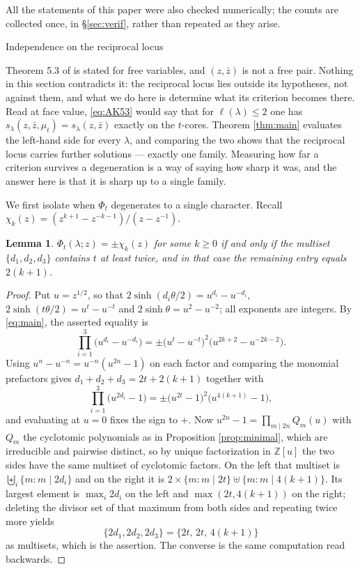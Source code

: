 \documentclass[11pt,reqno]{amsart}
\makeatletter
\renewcommand\section{\@startsection{section}{1}%
  \z@{\linespacing\@plus\linespacing}{.5\linespacing}%
  {\normalfont\large\bfseries\centering}}
\theoremstyle{plain}
\newtheorem{lemma}[theorem]{Lemma}
\theoremstyle{definition}
\newcommand{\ZZ}{\mathbb{Z}}
\newcommand{\zt}{\mu_t}
\newcommand{\zb}{\bar z}
\makeatother
\begin{document}
All the statements of this paper were also checked numerically; the counts are collected once, in
\S\ref{sec:verif}, rather than repeated as they arise.

\section{Independence on the reciprocal locus}\label{sec:independence}

Theorem 5.3 of \cite{AK25} is stated for free variables, and $(z,\zb)$ is not a free pair. Nothing
in this section contradicts it: the reciprocal locus lies outside its hypotheses, not against them,
and what we do here is determine what its criterion becomes there. Read at face value,
\eqref{eq:AK53} would say that for $\ell(\lambda)\le2$ one has
$s_\lambda(z,\zb,\zt)=s_\lambda(z,\zb)$ exactly on the $t$-cores. Theorem
\ref{thm:main} evaluates the left-hand side for every $\lambda$, and comparing the two shows that the
reciprocal locus carries further solutions --- exactly one family. Measuring how far a criterion
survives a degeneration is a way of saying how sharp it was, and the answer here is that it is sharp
up to a single family.

We first isolate when $\Phi_t$ degenerates to a single character. Recall
$\chi_k(z)=(z^{k+1}-z^{-k-1})/(z-z^{-1})$.

\begin{lemma}\label{lem:single}
$\Phi_t(\lambda;z)=\pm\chi_k(z)$ for some $k\ge0$ if and only if the multiset $\{d_1,d_2,d_3\}$
contains $t$ at least twice, and in that case the remaining entry equals $2(k+1)$.
\end{lemma}

\begin{proof}
Put $u=z^{1/2}$, so that $2\sinh(d_i\theta/2)=u^{d_i}-u^{-d_i}$, $2\sinh(t\theta/2)=u^{t}-u^{-t}$ and
$2\sinh\theta=u^{2}-u^{-2}$; all exponents are integers. By \eqref{eq:main}, the asserted equality is
\[
\prod_{i=1}^{3}\bigl(u^{d_i}-u^{-d_i}\bigr)
=\pm\bigl(u^{t}-u^{-t}\bigr)^{2}\bigl(u^{2k+2}-u^{-2k-2}\bigr).
\]
Using $u^{n}-u^{-n}=u^{-n}(u^{2n}-1)$ on each factor and comparing the monomial prefactors gives
$d_1+d_2+d_3=2t+2(k+1)$ together with
\[
\prod_{i=1}^{3}\bigl(u^{2d_i}-1\bigr)=\pm\bigl(u^{2t}-1\bigr)^{2}\bigl(u^{4(k+1)}-1\bigr),
\]
and evaluating at $u=0$ fixes the sign to $+$. Now $u^{2n}-1=\prod_{m\mid 2n}Q_m(u)$ with
$Q_m$ the cyclotomic polynomials as in Proposition \ref{prop:minimal}, which are irreducible and
pairwise distinct, so by unique
factorization in $\ZZ[u]$ the two sides have the same multiset of cyclotomic factors. On the left
that multiset is $\biguplus_i\{m:m\mid 2d_i\}$ and on the right it is
$2\times\{m:m\mid 2t\}\uplus\{m:m\mid 4(k+1)\}$. Its largest element is $\max_i 2d_i$ on the left and
$\max(2t,4(k+1))$ on the right; deleting the divisor set of that maximum from both sides and
repeating twice more yields
\[
\{2d_1,2d_2,2d_3\}=\{2t,\,2t,\,4(k+1)\}
\]
as multisets, which is the assertion. The converse is the same computation read backwards.
\end{proof}
\end{document}
